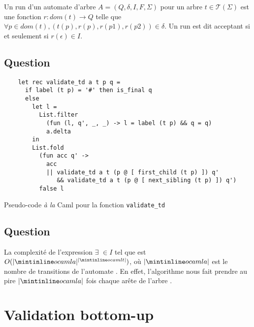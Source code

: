 \documentclass[twoside,12pt]{article}
\begin{document}
Un run d'un automate d'arbre $A = (Q, \delta, I, F, \Sigma)$
pour un arbre $t \in {\mathcal{T}}(\Sigma)$
est une fonction $r : dom(t) \to Q$
telle que $\forall p \in dom(t), (t(p), r(p), r(p1),r(p2)) \in \delta$.
Un run est dit acceptant si et seulement si $r (\epsilon) \in I$.

\subsection{Question}

\begin{algorithm}
    \bigskip
  \begin{verbatim}
    let rec validate_td a t p q =
      if label (t p) = '#' then is_final q
      else
        let l =
          List.filter
            (fun (l, q', _, _) -> l = label (t p) && q = q)
            a.delta
        in
        List.fold
          (fun acc q' ->
            acc
            || validate_td a t (p @ [ first_child (t p) ]) q'
               && validate_td a t (p @ [ next_sibling (t p) ]) q')
          false l
   \end{verbatim}
   \caption{\small Pseudo-code \textit{à la} Caml pour la fonction \texttt{validate\_td}}
\end{algorithm}

\subsection{Question}

La complexité de l'expression
$\exists$  $\in I$ tel que 
est $O(|\ocaml{a}|^{|\ocaml{t}|})$, où $|\ocaml{a}|$ est le nombre de
transitions de l'automate . En effet, l'algorithme
nous fait prendre au pire $|\ocaml{a}|$ fois chaque arête de l'arbre .


\section{Validation bottom-up}
\end{document}
